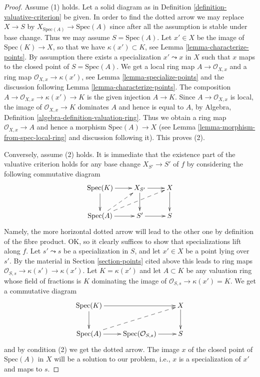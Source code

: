 \begin{proof}
Assume (1) holds. Let a solid diagram as in
Definition \ref{definition-valuative-criterion} be given.
In order to find the dotted arrow we may replace $X \to S$
by $X_{\text{Spec}(A)} \to \text{Spec}(A)$ since after all
the assumption is stable under base change.
Thus we may assume $S = \text{Spec}(A)$.
Let $x' \in X$ be the image of $\text{Spec}(K) \to X$, so
that we have $\kappa(x') \subset K$, see
Lemma \ref{lemma-characterize-points}.
By assumption there exists a specialization $x' \leadsto x$
in $X$ such that $x$ maps to the closed point of $S = \text{Spec}(A)$.
We get a local ring map $A \to \mathcal{O}_{X, x}$ and a ring
map $\mathcal{O}_{X, x} \to \kappa(x')$, see
Lemma \ref{lemma-specialize-points} and the discussion following
Lemma \ref{lemma-characterize-points}. The composition
$A \to \mathcal{O}_{X, x} \to \kappa(x') \to K$ is the
given injection $A \to K$. Since $A \to \mathcal{O}_{X, x}$
is local, the image of $\mathcal{O}_{X, x} \to K$
dominates $A$ and hence is equal to $A$, by
Algebra, Definition \ref{algebra-definition-valuation-ring}.
Thus we obtain a ring map $\mathcal{O}_{X, x} \to A$ and
hence a morphism $\text{Spec}(A) \to X$
(see Lemma \ref{lemma-morphism-from-spec-local-ring} and
discussion following it). This proves (2).

\medskip\noindent
Conversely, assume (2) holds. It is immediate that
the existence part of the valuative criterion holds for
any base change $X_{S'} \to S'$ of $f$ by considering
the following commutative diagram
$$
\xymatrix{
\text{Spec}(K) \ar[r] \ar[d] & X_{S'} \ar[r] \ar[d] & X \ar[d] \\
\text{Spec}(A) \ar[r] \ar@{-->}[ru] \ar@{-->}[rru] & S' \ar[r] & S
}
$$
Namely, the more horizontal dotted arrow will lead to the
other one by definition of the fibre product. OK, so it clearly
suffices to show that specializations lift along $f$.
Let $s' \leadsto s$ be a specialization in $S$, and let
$x' \in X$ be a point lying over $s'$. By the material in
Section \ref{section-points} cited above this leads to ring maps
$\mathcal{O}_{S, s} \to \kappa(s') \to \kappa(x')$.
Let $K = \kappa(x')$ and let $A \subset K$ be any valuation
ring whose field of fractions is $K$ dominating the
image of $\mathcal{O}_{S, s} \to \kappa(x') = K$.
We get a commutative diagram
$$
\xymatrix{
\text{Spec}(K) \ar[rr] \ar[d] & & X \ar[d] \\
\text{Spec}(A) \ar[r] \ar@{-->}[rru] &
\text{Spec}(\mathcal{O}_{S, s}) \ar[r] & S
}
$$
and by condition (2) we get the dotted arrow.
The image $x$ of the closed point of $\text{Spec}(A)$
in $X$ will be a solution to our problem, i.e.,
$x$ is a specialization of $x'$ and maps to $s$.
\end{proof}

